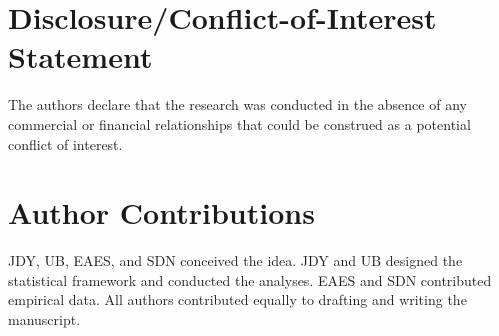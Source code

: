 \documentclass{article}
\begin{document}
\section*{Disclosure/Conflict-of-Interest Statement}

The authors declare that the research was conducted in the absence of any commercial or financial relationships that could be construed as a potential conflict of interest.

\section*{Author Contributions}
JDY, UB, EAES, and SDN conceived the idea.
JDY and UB designed the statistical framework and conducted the analyses.
EAES and SDN contributed empirical data.
All authors contributed equally to drafting and writing the manuscript.
\end{document}
